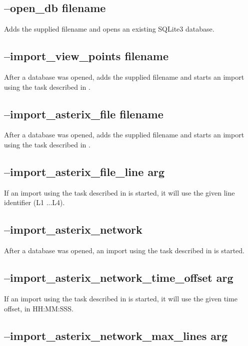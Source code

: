 \subsection{--open\_db filename}

Adds the supplied filename and opens an existing SQLite3 database.

\subsection{--import\_view\_points filename}

After a database was opened, adds the supplied filename and starts an import using the task described in .
 
\subsection{--import\_asterix\_file filename}

After a database was opened, adds the supplied filename and starts an import using the task described in .

\subsection{--import\_asterix\_file\_line arg}

If an import using the task described in  is started, it will use the given line identifier (L1 ...L4).

\subsection{--import\_asterix\_network}

After a database was opened, an import using the task described in  is started.

\subsection{--import\_asterix\_network\_time\_offset arg}

If an import using the task described in  is started, it will use the given time offset, in HH:MM:SSS.

\subsection{--import\_asterix\_network\_max\_lines arg}

